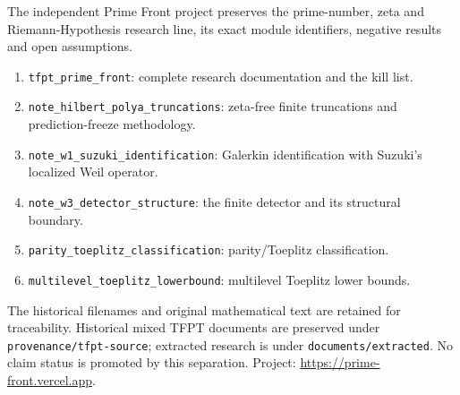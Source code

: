 \begin{navbox}
The independent Prime Front project preserves the prime-number, zeta and Riemann-Hypothesis research line, its exact module identifiers, negative results and open assumptions.
\begin{enumerate}[leftmargin=2em,itemsep=1pt]
\item \texttt{tfpt\_prime\_front}: complete research documentation and the kill list.
\item \texttt{note\_hilbert\_polya\_truncations}: zeta-free finite truncations and prediction-freeze methodology.
\item \texttt{note\_w1\_suzuki\_identification}: Galerkin identification with Suzuki's localized Weil operator.
\item \texttt{note\_w3\_detector\_structure}: the finite detector and its structural boundary.
\item \texttt{parity\_toeplitz\_classification}: parity/Toeplitz classification.
\item \texttt{multilevel\_toeplitz\_lowerbound}: multilevel Toeplitz lower bounds.
\end{enumerate}
The historical filenames and original mathematical text are retained for traceability. Historical mixed TFPT documents are preserved under \texttt{provenance/tfpt-source}; extracted research is under \texttt{documents/extracted}. No claim status is promoted by this separation. Project: \url{https://prime-front.vercel.app}.
\end{navbox}
